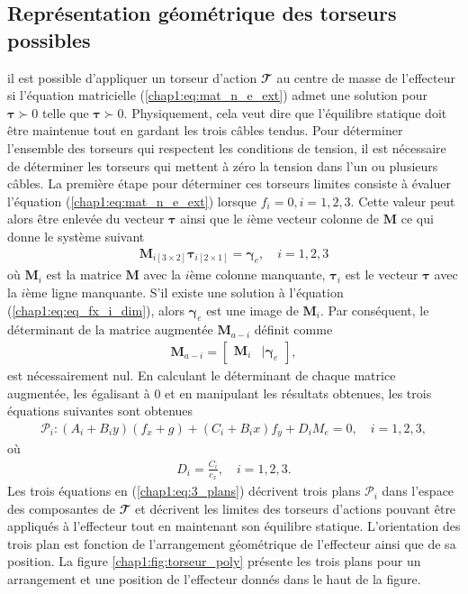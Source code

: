 \subsection{Représentation géométrique des torseurs possibles}
il est possible d'appliquer un torseur d'action $\mathbfcal{T}$ au centre de masse de l'effecteur si l'équation matricielle (\ref{chap1:eq:mat_n_e_ext}) admet une solution pour $\bm{\tau}\succ 0$ telle que $\bm{\tau}\succ 0$. Physiquement, cela veut dire que l'équilibre statique doit être maintenue tout en gardant les trois câbles tendus. Pour déterminer l'ensemble des torseurs qui respectent les conditions de tension, il est nécessaire de déterminer les torseurs qui mettent à zéro la tension dans l'un ou plusieurs câbles. La première étape pour déterminer ces torseurs limites consiste à évaluer l'équation (\ref{chap1:eq:mat_n_e_ext}) lorsque $f_i=0, i=1,2,3$. Cette valeur peut alors être enlevée du vecteur $\bm{\tau}$ ainsi que le $i$ème vecteur colonne de $\mathbf{M}$ ce qui donne le système suivant
\begin{align}
\mathbf{M}_{i[3\times 2]}\bm{\tau}_{i[2\times 1]} = \bm{\gamma}_{e},\quad i=1,2,3 \label{chap1:eq:eq_fx_i_dim}
\end{align}
où $\mathbf{M}_{i}$ est la matrice $\mathbf{M}$ avec la $i$ème colonne manquante, $\bm{\tau}_{i}$ est le vecteur $\bm{\tau}$ avec la $i$ème ligne manquante. S'il existe une solution à l'équation (\ref{chap1:eq:eq_fx_i_dim}), alors $\bm{\gamma}_{e}$ est une image de $\mathbf{M}_{i}$. Par conséquent, le déterminant de la matrice augmentée $\mathbf{M}_{a-i}$ définit comme 
\begin{align}
\mathbf{M}_{a-i} = \begin{bmatrix}
\mathbf{M}_{i} & |\bm{\gamma}_{e}
\end{bmatrix},
\end{align}
est nécessairement nul. En calculant le déterminant de chaque matrice augmentée, les égalisant à 0 et en manipulant les résultats obtenues, les trois équations suivantes sont obtenues
\begin{align}
\mathcal{P}_i:\left(A_i+B_iy\right)(f_x+g)+\left(C_i+B_ix\right)f_y+D_iM_e =0,\quad i=1,2,3, \label{chap1:eq:3_plans}
\end{align}
où 
\begin{align}
D_i=\frac{C_i}{c_x},\quad i=1,2,3.
\end{align}
Les trois équations en (\ref{chap1:eq:3_plans}) décrivent trois plans $\mathcal{P}_i$ dans l'espace des composantes de $\mathbfcal{T}$ et décrivent les limites des torseurs d'actions pouvant être appliqués à l'effecteur tout en maintenant son équilibre statique. L'orientation des trois plan est fonction de l'arrangement géométrique de l'effecteur ainsi que de sa position. La figure \ref{chap1:fig:torseur_poly} présente les trois plans pour un arrangement et une position de l'effecteur donnés dans le haut de la figure. 
